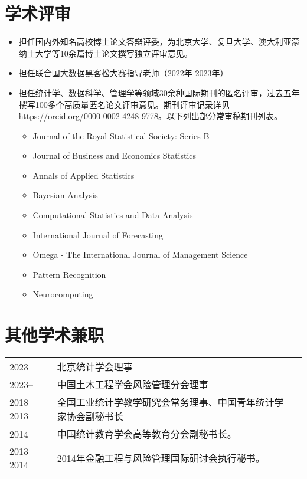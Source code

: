 \documentclass[twoside,a4paper,11pt]{article}
\begin{document}
\section{学术评审}

\begin{itemize}
\item   担任国内外知名高校博士论文答辩评委，为北京大学、复旦大学、澳大利亚蒙纳士大学等10余篇博士论文撰写独立评审意见。
\item   担任联合国大数据黑客松大赛指导老师（2022年-2023年）
\item   担任统计学、数据科学、管理学等领域30余种国际期刊的匿名评审，过去五年撰写100多个高质量匿名论文评审意见。期刊评审记录详见 \url{https://orcid.org/0000-0002-4248-9778}。以下列出部分常审稿期刊列表。
\begin{itemize}
\item Journal of the Royal Statistical Society: Series B
\item Journal of Business and Economics Statistics
\item Annals of Applied Statistics
\item Bayesian Analysis
\item Computational Statistics and Data Analysis
\item International Journal of Forecasting
\item Omega - The International Journal of Management Science
\item Pattern Recognition
\item Neurocomputing
\end{itemize}
\end{itemize}

\section{其他学术兼职}
\begin{tabular}{l p{} l}
  2023--     & 北京统计学会理事                 \\
  2023--     & 中国土木工程学会风险管理分会理事 \\
  2018--2013 & 全国工业统计学教学研究会常务理事、中国青年统计学家协会副秘书长 \\
  2014--     & 中国统计教育学会高等教育分会副秘书长。                         \\
  2013--2014 & 2014年金融工程与风险管理国际研讨会执行秘书。                   \\
\end{tabular}
\end{document}
